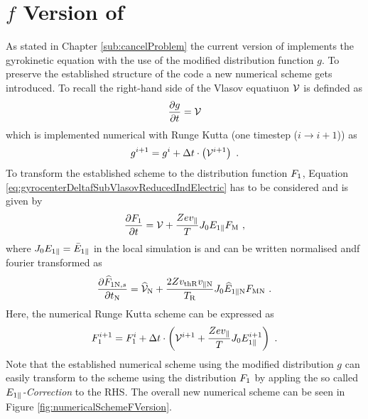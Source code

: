 \section{$f$ Version of {\gkw}}
\label{sec:implementationFVersion}

As stated in Chapter \ref{sub:cancelProblem} the current version of {\gkw} implements the gyrokinetic equation with the use of the modified distribution function $g$. To preserve the established structure of the code a new numerical scheme gets introduced. To recall the right-hand side of the Vlasov equatiuon $\mathcal{V}$ is definded as
\begin{gather}
    \frac{\partial g}{\partial t} = \mathcal{V}
    \label{eq:rightHandSideRecall}
\end{gather}
which is implemented numerical with Runge Kutta (one timestep ($i \rightarrow i+1$)) as
\begin{gather}
    g^{i+1} = g^{i} + \Delta t \cdot \left(\mathcal{V}^{i+1}\right) ~.
    \label{eq:numericalSchemeModifiedDistribution}
\end{gather}
To transform the established scheme to the distribution function $F_1$, Equation \ref{eq:gyrocenterDeltafSubVlasovReducedIndElectric} has to be considered and is given by
\begin{gather}
    \frac{\partial F_1}{\partial t} = \mathcal{V} + \frac{Ze v_\parallel}{T} J_0 E_{1\parallel} F_\mathrm{M}~,
    \label{eq:gyrocenterDeltafSubVlasovReducedIndElectricRecall}
\end{gather}
where $J_0 E_{1\parallel} = \bar{E}_{1\parallel}$ in the local simulation is and can be written normalised andf fourier transformed as 
\begin{gather}
    \frac{\partial \widehat{F}_{1\mathrm{N},s}}{\partial t_\mathrm{N}} = \widehat{\mathcal{V}}_\mathrm{N} + \frac{2 Z v_{\mathrm{th} \mathrm{R}} v_{\parallel \mathrm{N}}}{T_\mathrm{R}} J_0 \widehat{E}_{1\parallel \mathrm{N}} F_{\mathrm{M} \mathrm{N}}~.
    \label{eq:gyrocenterDeltafSubVlasovReducedIndElectricNorm}
\end{gather}
Here, the numerical Runge Kutta scheme can be expressed as
\begin{gather}
    F_1^{i+1} = F_1^{i} + \Delta t \cdot \left(\mathcal{V}^{i+1} + \frac{Ze v_\parallel}{T} J_0 E_{1\parallel}^{i+1} \right) ~.
    \label{eq:numericalSchemeModifiedDistribution}
\end{gather}
Note that the established numerical scheme using the modified distribution $g$ can easily transform to the scheme using the distribution $F_1$ by appling the so called \textit{$E_{1\parallel}$-Correction} to the RHS. The overall new numerical scheme can be seen in Figure \ref{fig:numericalSchemeFVersion}.


